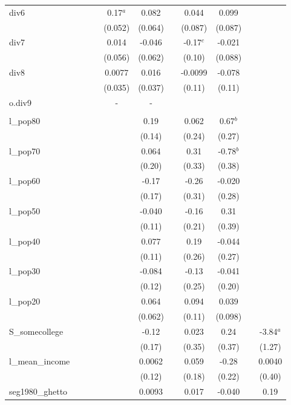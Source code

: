\documentclass[]{article}
\begin{document}
\begin{tabular}{lcccccccccc}
div6 &  &  &  & 0.17$^a$ & 0.082 &  & 0.044 & 0.099 &  &  \\
 &  &  &  & (0.052) & (0.064) &  & (0.087) & (0.087) &  &  \\
div7 &  &  &  & 0.014 & -0.046 &  & -0.17$^c$ & -0.021 &  &  \\
 &  &  &  & (0.056) & (0.062) &  & (0.10) & (0.088) &  &  \\
div8 &  &  &  & 0.0077 & 0.016 &  & -0.0099 & -0.078 &  &  \\
 &  &  &  & (0.035) & (0.037) &  & (0.11) & (0.11) &  &  \\
o.div9 &  &  &  & - & - &  &  &  &  &  \\
 &  &  &  &  &  &  &  &  &  &  \\
l\_pop80 &  &  &  &  & 0.19 &  & 0.062 & 0.67$^b$ &  &  \\
 &  &  &  &  & (0.14) &  & (0.24) & (0.27) &  &  \\
l\_pop70 &  &  &  &  & 0.064 &  & 0.31 & -0.78$^b$ &  &  \\
 &  &  &  &  & (0.20) &  & (0.33) & (0.38) &  &  \\
l\_pop60 &  &  &  &  & -0.17 &  & -0.26 & -0.020 &  &  \\
 &  &  &  &  & (0.17) &  & (0.31) & (0.28) &  &  \\
l\_pop50 &  &  &  &  & -0.040 &  & -0.16 & 0.31 &  &  \\
 &  &  &  &  & (0.11) &  & (0.21) & (0.39) &  &  \\
l\_pop40 &  &  &  &  & 0.077 &  & 0.19 & -0.044 &  &  \\
 &  &  &  &  & (0.11) &  & (0.26) & (0.27) &  &  \\
l\_pop30 &  &  &  &  & -0.084 &  & -0.13 & -0.041 &  &  \\
 &  &  &  &  & (0.12) &  & (0.25) & (0.20) &  &  \\
l\_pop20 &  &  &  &  & 0.064 &  & 0.094 & 0.039 &  &  \\
 &  &  &  &  & (0.062) &  & (0.11) & (0.098) &  &  \\
S\_somecollege &  &  &  &  & -0.12 &  & 0.023 & 0.24 &  & -3.84$^a$ \\
 &  &  &  &  & (0.17) &  & (0.35) & (0.37) &  & (1.27) \\
l\_mean\_income &  &  &  &  & 0.0062 &  & 0.059 & -0.28 &  & 0.0040 \\
 &  &  &  &  & (0.12) &  & (0.18) & (0.22) &  & (0.40) \\
seg1980\_ghetto &  &  &  &  & 0.0093 &  & 0.017 & -0.040 &  & 0.19 \\

\end{tabular}
\end{document}
